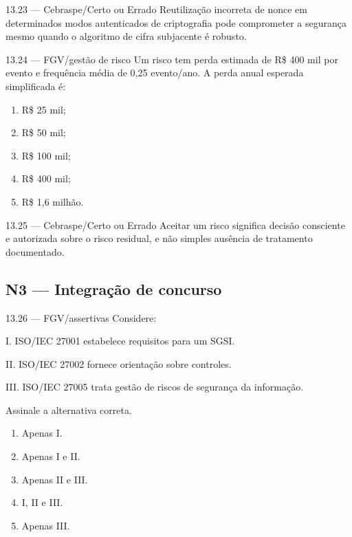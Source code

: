 \begin{questao}{ 13.23 — Cebraspe/Certo ou Errado}
Reutilização incorreta de nonce em determinados modos autenticados de criptografia pode comprometer a segurança mesmo quando o algoritmo de cifra subjacente é robusto.
\end{questao}

\begin{questao}{ 13.24 — FGV/gestão de risco}
Um risco tem perda estimada de R\$ 400 mil por evento e frequência média de 0,25 evento/ano. A perda anual esperada simplificada é:
\begin{enumerate}[label=\Alph*)]
\item R\$ 25 mil;
\item R\$ 50 mil;
\item R\$ 100 mil;
\item R\$ 400 mil;
\item R\$ 1,6 milhão.
\end{enumerate}
\end{questao}

\begin{questao}{ 13.25 — Cebraspe/Certo ou Errado}
Aceitar um risco significa decisão consciente e autorizada sobre o risco residual, e não simples ausência de tratamento documentado.
\end{questao}

\subsection*{N3 — Integração de concurso}

\begin{questao}{ 13.26 — FGV/assertivas}
Considere:

I. ISO/IEC 27001 estabelece requisitos para um SGSI.

II. ISO/IEC 27002 fornece orientação sobre controles.

III. ISO/IEC 27005 trata gestão de riscos de segurança da informação.

Assinale a alternativa correta.
\begin{enumerate}[label=\Alph*)]
\item Apenas I.
\item Apenas I e II.
\item Apenas II e III.
\item I, II e III.
\item Apenas III.
\end{enumerate}
\end{questao}

